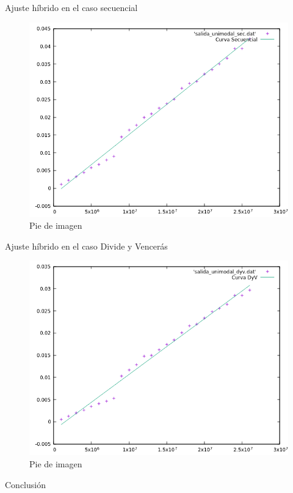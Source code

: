 \documentclass[12pt]{beamer}
\begin{document}

\begin{frame}{Ajuste híbrido en el caso secuencial}

\begin{figure}[H] 
\centering
\includegraphics[angle=0,scale=0.5]{img/AjusteHibridoSec.png} 
\caption{Pie de imagen} 
\end{figure}

\end{frame}

\begin{frame}{Ajuste híbrido en el caso Divide y Vencerás}

\begin{figure}[H] 
\centering
\includegraphics[angle=0,scale=0.5]{img/AjusteHibridoDyV.png} 
\caption{Pie de imagen} 
\end{figure}

\end{frame}

\begin{frame}{Conclusión}

\end{frame}
\end{document}
